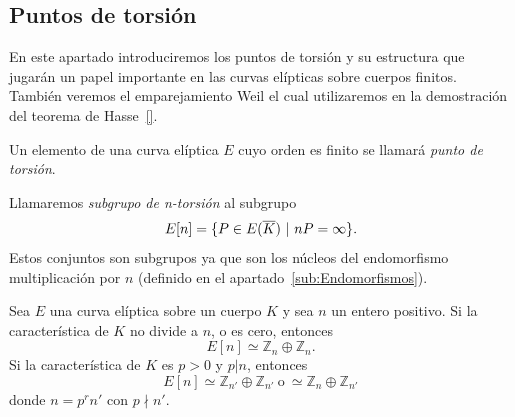 \subsection{Puntos de torsión}
\label{sub:Puntos de torsión}

En este apartado introduciremos los puntos de torsión y su estructura que jugarán un papel importante en las curvas elípticas sobre cuerpos finitos. También veremos el emparejamiento Weil el cual utilizaremos en la demostración del teorema de Hasse~\ref{}.

\begin{definicion}
	Un elemento de una curva elíptica $E$ cuyo orden es finito se llamará \emph{punto de torsión}.
\end{definicion}

\begin{definicion}
	Llamaremos \emph{subgrupo de n-torsión} al subgrupo
	$$
		E[n] = \{ P \in E(\overline{K}) \ | \  n P = \infty \}.
	$$
	Estos conjuntos son subgrupos ya que son los núcleos del endomorfismo multiplicación por $n$ (definido en el apartado~\ref{sub:Endomorfismos}).
\end{definicion}

%
%

\begin{teorema}\label{th:estructura subgrupos torsión}
	Sea $E$ una curva elíptica sobre un cuerpo $K$ y sea $n$ un entero positivo. Si la característica de $K$ no divide a $n$, o es cero, entonces
	$$
		E[n] \simeq \mathbb{Z}_n \oplus \mathbb{Z}_n.
	$$
	Si la característica de $K$ es $p > 0$ y $p | n$, entonces
	$$
		E[n] \simeq \mathbb{Z}_{n'} \oplus \mathbb{Z}_{n'} \ \textrm{o} \ \simeq \mathbb{Z}_{n} \oplus \mathbb{Z}_{n'}
	$$
	donde $n = p^r n'$ con $p \nmid n'$.
\end{teorema}

